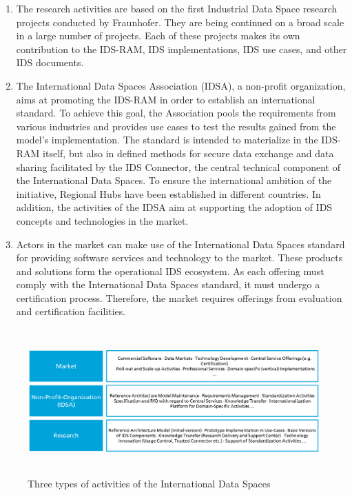 \begin{enumerate}
	\item The research activities are based on the first Industrial Data Space research projects conducted by Fraunhofer. They are being continued on a broad scale in a large number of projects. Each of these projects makes its own contribution to the IDS-RAM, IDS implementations, IDS use cases, and other IDS documents.

	\item  The International Data Spaces Association (IDSA), a non-profit organization, aims at promoting the IDS-RAM in order to establish an international standard. To achieve this goal, the Association pools the requirements from various industries and provides use cases to test the results gained from the model’s implementation. The standard is intended to materialize in the IDS-RAM itself, but also in defined methods for secure data exchange and data sharing facilitated by the IDS Connector, the central technical component of the International Data Spaces. To ensure the international ambition of the initiative, Regional Hubs have been established in different countries. In addition, the activities of the IDSA aim at supporting the adoption of IDS concepts and technologies in the market. 

	\item Actors in the market can make use of the International Data Spaces standard for providing software services and technology to the market. These products and solutions form the operational IDS ecosystem. As each offering must comply with the International Data Spaces standard, it must undergo a certification process. Therefore, the market requires offerings from evaluation and certification facilities.
\end{enumerate}




\begin{figure}[H]
	\begin{Center}
		\includegraphics[width=6.35in,height=2.2in]{./media/image10.png}
		\caption{ Three types of activities of the International Data Spaces}
		\label{fig:_Three_types_of_activities_of_the_International_Data_Spaces}
	\end{Center}
\end{figure}


